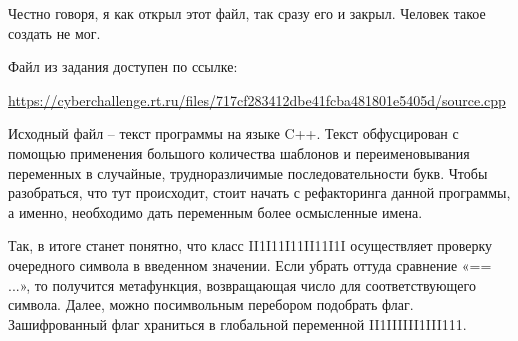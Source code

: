 
Честно говоря, я как открыл этот файл, так сразу его и закрыл. Человек такое создать не мог.

Файл из задания доступен по ссылке:

\url{https://cyberchallenge.rt.ru/files/717cf283412dbe41fcba481801e5405d/source.cpp}

\solutionSection

Исходный файл – текст программы на языке C++. Текст обфусцирован с помощью применения большого количества шаблонов и переименовывания переменных в случайные, трудноразличимые последовательности букв. Чтобы разобраться, что тут происходит, стоит начать с рефакторинга данной программы, а именно, необходимо дать переменным более осмысленные имена.

Так, в итоге станет понятно, что класс II1I11I11II11I1I осуществляет проверку очередного символа в введенном значении. Если убрать оттуда сравнение «== ...», то получится метафункция, возвращающая число для соответствующего символа. Далее, можно посимвольным перебором подобрать флаг. Зашифрованный флаг храниться в глобальной переменной II1IIIIII1III111.

